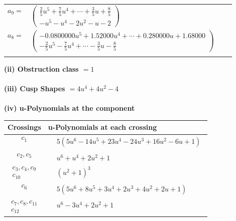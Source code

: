 \documentclass[1p]{elsarticle_modified}
\theoremstyle{definition}
\begin{document}
\begin{tabular}{m{7pt} m{180pt} m{7pt} m{180pt} }
\flushright $a_{9}=$&$\begin{pmatrix}\frac{2}{5} u^5+\frac{7}{5} u^4+\cdots+\frac{3}{5} u+\frac{8}{5}\\- u^5- u^4-2 u^2- u-2\end{pmatrix}$ \\
\flushright $a_{8}=$&$\begin{pmatrix}-0.0800000 u^{5}+1.52000 u^{4}+\cdots+0.280000 u+1.68000\\-\frac{2}{5} u^5-\frac{7}{5} u^4+\cdots-\frac{3}{5} u-\frac{8}{5}\end{pmatrix}$\\&\end{tabular}
\flushleft \textbf{(ii) Obstruction class $= 1$}\\~\\
\flushleft \textbf{(iii) Cusp Shapes $= 4 u^4+4 u^2-4$}\\~\\
\newpage\renewcommand{\arraystretch}{1}
\flushleft \textbf{(iv) u-Polynomials at the component}\newline \\
\begin{tabular}{m{50pt}|m{274pt}}
Crossings & \hspace{64pt}u-Polynomials at each crossing \\
\hline $$\begin{aligned}c_{1}\end{aligned}$$&$\begin{aligned}
&5(5 u^6-14 u^5+23 u^4-24 u^3+16 u^2-6 u+1)
\end{aligned}$\\
\hline $$\begin{aligned}c_{2},c_{5}\end{aligned}$$&$\begin{aligned}
&u^6+u^4+2 u^2+1
\end{aligned}$\\
\hline $$\begin{aligned}c_{3},c_{4},c_{9}\\c_{10}\end{aligned}$$&$\begin{aligned}
&(u^2+1)^3
\end{aligned}$\\
\hline $$\begin{aligned}c_{6}\end{aligned}$$&$\begin{aligned}
&5(5 u^6+8 u^5+3 u^4+2 u^3+4 u^2+2 u+1)
\end{aligned}$\\
\hline $$\begin{aligned}c_{7},c_{8},c_{11}\\c_{12}\end{aligned}$$&$\begin{aligned}
&u^6-3 u^4+2 u^2+1
\end{aligned}$\\
\hline
\end{tabular}\\~\\
\end{document}
